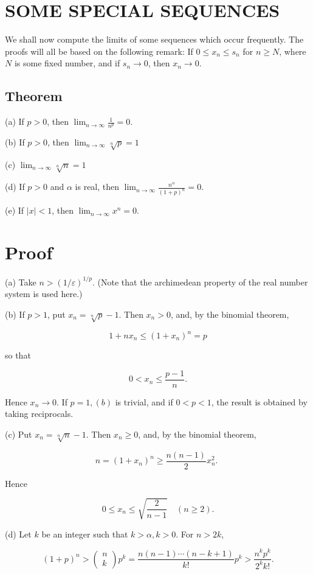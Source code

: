 \documentclass[10pt]{article}
\begin{document}
\section{SOME SPECIAL SEQUENCES}
We shall now compute the limits of some sequences which occur frequently. The proofs will all be based on the following remark: If $0 \leq x_{n} \leq s_{n}$ for $n \geq N$, where $N$ is some fixed number, and if $s_{n} \rightarrow 0$, then $x_{n} \rightarrow 0$.

\subsection{Theorem}
(a) If $p>0$, then $\lim _{n \rightarrow \infty} \frac{1}{n^{p}}=0$.

(b) If $p>0$, then $\lim _{n \rightarrow \infty} \sqrt[n]{p}=1$

(c) $\lim _{n \rightarrow \infty} \sqrt[n]{n}=1$

(d) If $p>0$ and $\alpha$ is real, then $\lim _{n \rightarrow \infty} \frac{n^{\alpha}}{(1+p)^{n}}=0$.

(e) If $|x|<1$, then $\lim _{n \rightarrow \infty} x^{n}=0$.

\section{Proof}
(a) Take $n>(1 / \varepsilon)^{1 / p}$. (Note that the archimedean property of the real number system is used here.)

(b) If $p>1$, put $x_{n}=\sqrt[n]{p}-1$. Then $x_{n}>0$, and, by the binomial theorem,

$$
1+n x_{n} \leq\left(1+x_{n}\right)^{n}=p
$$

so that

$$
0<x_{n} \leq \frac{p-1}{n} .
$$

Hence $x_{n} \rightarrow 0$. If $p=1,(b)$ is trivial, and if $0<p<1$, the result is obtained by taking reciprocals.

(c) Put $x_{n}=\sqrt[n]{n}-1$. Then $x_{n} \geq 0$, and, by the binomial theorem,

$$
n=\left(1+x_{n}\right)^{n} \geq \frac{n(n-1)}{2} x_{n}^{2} \text {. }
$$

Hence

$$
0 \leq x_{n} \leq \sqrt{\frac{2}{n-1}} \quad(n \geq 2) .
$$

(d) Let $k$ be an integer such that $k>\alpha, k>0$. For $n>2 k$,

$$
(1+p)^{n}>\left(\begin{array}{l}
n \\
k
\end{array}\right) p^{k}=\frac{n(n-1) \cdots(n-k+1)}{k !} p^{k}>\frac{n^{k} p^{k}}{2^{k} k !} .
$$
\end{document}
